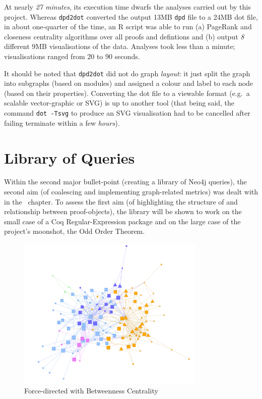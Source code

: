 At nearly \emph{27 minutes}, its execution time dwarfs the analyses carried out
by this project. Whereas \texttt{dpd2dot} converted the output 13MB \texttt{dpd}
file to a 24MB dot file, in about one-quarter of the time, an R script was able
to run (a) PageRank and closeness centrality algorithms over all proofs and
defintions and (b) output \emph{8} different 9MB visualisations of the data.
Analyses took less than a minute; visualisations ranged from 20 to 90 seconds.

It should be noted that \texttt{dpd2dot} did not do graph \emph{layout}: it just
split the graph into subgraphs (based on modules) and assigned a colour and label
to each node (based on their properties). Converting the dot file to a viewable
format (e.g.\ a scalable vector-graphic or SVG) is up to another tool (that
being said, the command \texttt{dot -Tsvg} to produce an SVG visualisation had to
be cancelled after failing terminate within a few \emph{hours}).

\section{Library of Queries}\label{sec:libeval}

Within the second major bullet-point (creating a library of Neo4j queries), the
second aim (of coalescing and implementing graph-related metrics) was dealt
with in the~ chapter. To assess the first aim (of
highlighting the structure of and relationship between proof-objects), the
library will be shown to work on the small case of a Coq Regular-Expression
package and on the large case of the project's moonshot, the
Odd Order Theorem.

\begin{figure}[p]
\centering
\includegraphics[width=0.8\textwidth]{img/regexp/direct.png}
\caption{Force-directed with Betweenness Centrality}\label{fig:regexp:direct}
\end{figure}

